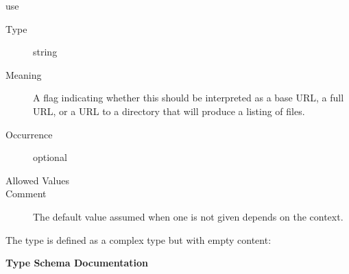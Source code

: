 \documentclass[11pt,a4paper]{ivoa}
\begin{document}
\begingroup\small\begin{bigdescription}
\item[use]
\begin{description}
\item[Type] string
\item[Meaning] 
               A flag indicating whether this should be interpreted as a base
               URL, a full URL, or a URL to a directory that will produce a 
               listing of files.
             
\item[Occurrence] optional

\item[Allowed Values]\hfil
{}
\item[Comment] 
               The default value assumed when one is not given depends on the 
               context.  
             
\end{description}


\end{bigdescription}\endgroup

\endgroup


The  type is
defined as a complex type but with empty content:


\begingroup
      	\renewcommand*\descriptionlabel[1]{%
      	\hbox to 5.5em{\emph{#1}\hfil}}\vspace{2ex}\noindent\textbf{ Type Schema Documentation}

\end{document}
